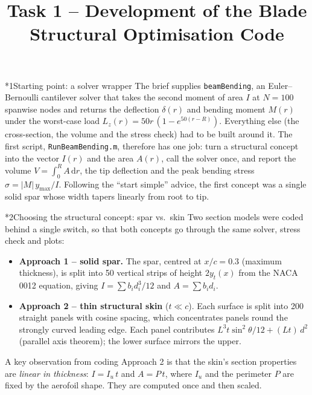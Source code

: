 \documentclass[10pt,a4paper]{article}
\title{\vspace{-1.6cm}\Large\bfseries Task 1 -- Development of the Blade Structural Optimisation Code}
\author{}
\date{\vspace{-1.2cm}}
\makeatletter
\renewcommand\section{\@startsection{section}{1}{0pt}{8pt plus 2pt}{3pt}{\large\bfseries}}
\makeatother
\begin{document}
\maketitle

\section*{1\quad Starting point: a solver wrapper}
The brief supplies \texttt{beamBending}, an Euler--Bernoulli cantilever solver that
takes the second moment of area $I$ at $N=100$ spanwise nodes and returns the
deflection $\delta(r)$ and bending moment $M(r)$ under the worst-case load
$L_z(r)=50r\,(1-e^{50(r-R)})$. Everything else (the cross-section, the volume and the
stress check) had to be built around it. The first script, \texttt{RunBeamBending.m},
therefore has one job: turn a structural concept into the vector $I(r)$ and the area
$A(r)$, call the solver once, and report the volume $V=\int_0^R A\,\mathrm{d}r$, the tip
deflection and the peak bending stress $\sigma=|M|\,y_{\max}/I$. Following the
``start simple'' advice, the first concept was a single solid spar whose width tapers
linearly from root to tip.

\section*{2\quad Choosing the structural concept: spar vs.\ skin}
Two section models were coded behind a single switch, so that both concepts go through
the same solver, stress check and plots:
\begin{itemize}
  \item \textbf{Approach 1 -- solid spar.} The spar, centred at $x/c=0.3$ (maximum
  thickness), is split into 50 vertical strips of height $2y_t(x)$ from the NACA\,0012
  equation, giving $I=\sum b_i d_i^3/12$ and $A=\sum b_i d_i$.
  \item \textbf{Approach 2 -- thin structural skin} ($t\ll c$). Each surface is split into
  200 straight panels with cosine spacing, which concentrates panels round the
  strongly curved leading edge. Each panel contributes
  $L^3t\sin^2\theta/12 + (Lt)\,d^2$ (parallel axis theorem); the lower surface mirrors
  the upper.
\end{itemize}
A key observation from coding Approach 2 is that the skin's section properties are
\emph{linear in thickness}: $I=I_u\,t$ and $A=P\,t$, where $I_u$ and the perimeter $P$
are fixed by the aerofoil shape. They are computed once and then scaled.
\end{document}
